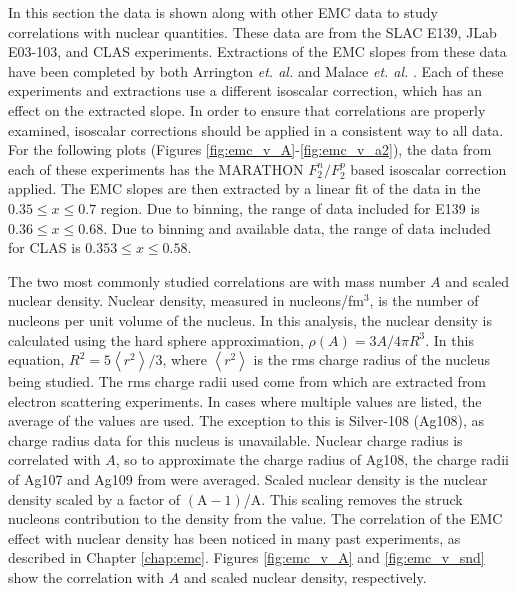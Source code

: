 In this section the data is shown along with other EMC data to study correlations with nuclear quantities. These data are from the SLAC E139, JLab E03-103, and CLAS experiments. Extractions of the EMC slopes from these data have been completed by both Arrington \textit{et. al.} \cite{arrington_src} and Malace \textit{et. al.} \cite{malace_emc}. Each of these experiments and extractions use a different isoscalar correction, which has an effect on the extracted slope. In order to ensure that correlations are properly examined, isoscalar corrections should be applied in a consistent way to all data. For the following plots (Figures \ref{fig:emc_v_A}-\ref{fig:emc_v_a2}), the data from each of these experiments has the MARATHON $F_2^n/F_2^p$ based isoscalar correction applied. The EMC slopes are then extracted by a linear fit of the data in the $0.35 \leq x \leq 0.7$ region. Due to binning, the range of data included for E139 is $0.36 \leq x \leq 0.68$. Due to binning and available data, the range of data included for CLAS is $0.353 \leq x \leq 0.58$.

The two most commonly studied correlations are with mass number $A$ and scaled nuclear density. Nuclear density, measured in nucleons/fm$^{3}$, is the number of nucleons per unit volume of the nucleus. In this analysis, the nuclear density is calculated using the hard sphere approximation, $\rho\left(A\right) = 3A/4\pi R^3$. In this equation, $R^2=5\left<r^2\right>/3$, where $\left<r^2\right>$ is the rms charge radius of the nucleus being studied. The rms charge radii used come from \cite{DeVries} which are extracted from electron scattering experiments. In cases where multiple values are listed, the average of the values are used. The exception to this is Silver-108 (Ag108), as charge radius data for this nucleus is unavailable. Nuclear charge radius is correlated with $A$, so to approximate the charge radius of Ag108, the charge radii of Ag107 and Ag109 from \cite{2012_charge_radii} were averaged. Scaled nuclear density is the nuclear density scaled by a factor of $\left(\text{A}-1\right)$/A. This scaling removes the struck nucleons contribution to the density from the value. The correlation of the EMC effect with nuclear density has been noticed in many past experiments, as described in Chapter \ref{chap:emc}. Figures \ref{fig:emc_v_A} and \ref{fig:emc_v_snd} show the correlation with $A$ and scaled nuclear density, respectively.

